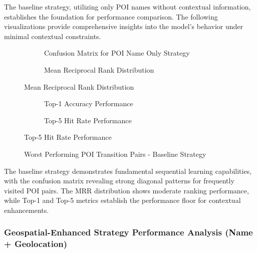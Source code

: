 \documentclass[12pt,a4paper]{article}
\begin{document}
The baseline strategy, utilizing only POI names without contextual information, establishes the foundation for performance comparison. The following visualizations provide comprehensive insights into the model's behavior under minimal contextual constraints.

\begin{figure}[h]
\centering
\begin{subfigure}{0.48\textwidth}
\centering
\caption{Confusion Matrix for POI Name Only Strategy}
\label{fig:baseline_confusion}
\end{subfigure}
\hfill
\begin{subfigure}{0.48\textwidth}
\centering
\caption{Mean Reciprocal Rank Distribution}
\label{fig:baseline_mrr}
\end{subfigure}
\end{figure}

\begin{figure}[h]
\centering
\begin{subfigure}{0.48\textwidth}
\centering
\caption{Top-1 Accuracy Performance}
\label{fig:baseline_top1}
\end{subfigure}
\hfill
\begin{subfigure}{0.48\textwidth}
\centering
\caption{Top-5 Hit Rate Performance}
\label{fig:baseline_top5}
\end{subfigure}
\end{figure}

\begin{figure}[h]
\centering
\caption{Worst Performing POI Transition Pairs - Baseline Strategy}
\label{fig:baseline_worst_pairs}
\end{figure}

The baseline strategy demonstrates fundamental sequential learning capabilities, with the confusion matrix revealing strong diagonal patterns for frequently visited POI pairs. The MRR distribution shows moderate ranking performance, while Top-1 and Top-5 metrics establish the performance floor for contextual enhancements.

\subsubsection{Geospatial-Enhanced Strategy Performance Analysis (Name + Geolocation)}
\end{document}
